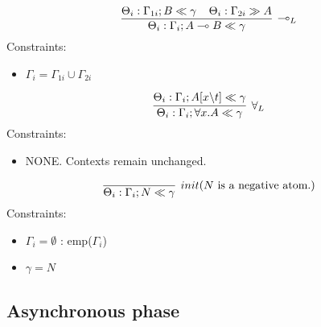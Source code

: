 \documentclass[a4paper, 11pt]{article}
\begin{document}
$$
\infer[\multimap_L]{\Theta_i : \Gamma_i ; A \multimap B \ll \gamma}
{
    \Theta_i : \Gamma_{1i} ; B \ll \gamma \;\;\;\;
    \Theta_i : \Gamma_{2i} \gg A
}
$$
Constraints:
\begin{itemize}
    \item $\Gamma_i = \Gamma_{1i} \cup \Gamma_{2i}$
\end{itemize}

$$
\infer[\forall_L]{\Theta_i : \Gamma_i ; \forall x. A \ll \gamma}
{
    \Theta_i : \Gamma_i ; A[x \backslash t] \ll \gamma
}
$$
Constraints:
\begin{itemize}
    \item NONE. Contexts remain unchanged.
\end{itemize}

$$
\infer[init \text{($N$ is a negative atom.)}]{\Theta_i : \Gamma_i ; N \ll \gamma}
{}
$$
Constraints:
\begin{itemize}
    \item $\Gamma_i = \emptyset$ : emp($\Gamma_i$)
    \item $\gamma = N$ %
\end{itemize}

\subsection*{Asynchronous phase}
\end{document}
